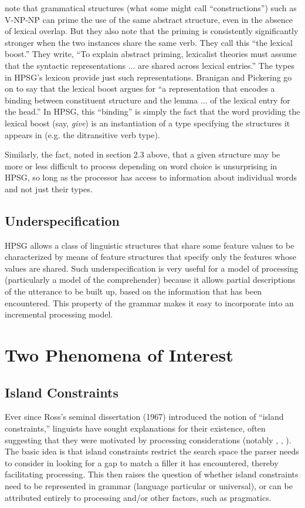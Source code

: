\documentclass[a4paper]{article}
\begin{document}
\citet{BraniganPickering2017} note that grammatical structures (what some might call ``constructions'') such as V-NP-NP can prime the use of the same abstract structure, even in the absence of lexical overlap.  But they also note that the priming is consistently significantly stronger when the two instances share the same verb.  They call this ``the lexical boost.''  They write, ``To explain abstract
priming, lexicalist theories must assume that the syntactic
representations ...
are shared across lexical entries.'' The types in HPSG's lexicon provide just such representations.  Branigan and Pickering go on to say that the lexical boost argues for ``a representation that
encodes a binding between constituent structure and the
lemma ... of the lexical entry for the
head.''  In HPSG, this ``binding'' is simply the fact that the word providing the lexical boost (say, {\it give}) is an instantiation of a type specifying the structures it appears in (e.g. the ditransitive verb type).

Similarly, the fact, noted in section 2.3 above, that a given structure may be more or less difficult to process depending on word choice is unsurprising in HPSG, so long as the processor has access to information about individual words and not just their types.   
\subsection{Underspecification}

HPSG allows a class of linguistic structures that share some feature values to be characterized by means of feature structures that specify only the features whose values are shared.  Such underspecification is very useful for a model of processing (particularly a model of the comprehender) because it allows partial descriptions of the utterance to be built up, based on the information that has been encountered.  This property of the grammar makes it easy to incorporate into an incremental processing model.

\section{Two Phenomena of Interest}
\subsection{Island Constraints}

Ever since Ross's seminal dissertation (1967) introduced the notion of ``island constraints,'' linguists have sought explanations for their existence, often suggesting that they were motivated by processing considerations (notably \citet{Grosu72-u}, \citet{Fodor83}, \citet{Deane91}).  The basic idea is that island constraints restrict the search space the parser needs to consider in looking for a gap to match a filler it has encountered, thereby facilitating processing.  This then raises the question of whether island constraints need to be represented in grammar (language particular or universal), or can be attributed entirely to processing and/or other factors, such as pragmatics.
\end{document}
